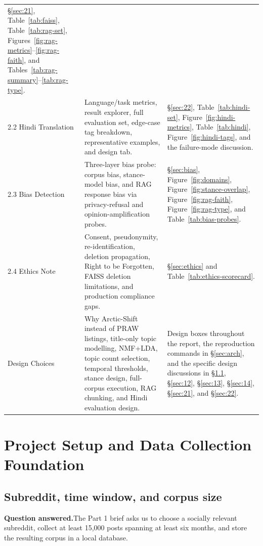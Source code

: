 \documentclass[11pt,a4paper]{article}
\newcommand{\questionanswered}[1]{%
  \par\medskip\noindent\textbf{Question answered.}\quad #1\par\medskip%
}
\begin{document}
\begin{table}[H]
\begin{tabularx}{\linewidth}{p{2.7cm} X X}
\S\ref{sec:21}, Table~\ref{tab:faiss}, Table~\ref{tab:rag-set}, Figures~\ref{fig:rag-metrics}--\ref{fig:rag-faith}, and Tables~\ref{tab:rag-summary}--\ref{tab:rag-type}. \\
2.2 Hindi Translation &
Language/task metrics, result explorer, full evaluation set, edge-case tag breakdown, representative examples, and design tab. &
\S\ref{sec:22}, Table~\ref{tab:hindi-set}, Figure~\ref{fig:hindi-metrics}, Table~\ref{tab:hindi}, Figure~\ref{fig:hindi-tags}, and the failure-mode discussion. \\
2.3 Bias Detection &
Three-layer bias probe: corpus bias, stance-model bias, and RAG response bias via privacy-refusal and opinion-amplification probes. &
\S\ref{sec:bias}, Figure~\ref{fig:domains}, Figure~\ref{fig:stance-overlap}, Figure~\ref{fig:rag-faith}, Figure~\ref{fig:rag-type}, and Table~\ref{tab:bias-probes}. \\
2.4 Ethics Note &
Consent, pseudonymity, re-identification, deletion propagation, Right to be Forgotten, FAISS deletion limitations, and production compliance gaps. &
\S\ref{sec:ethics} and Table~\ref{tab:ethics-scorecard}. \\
Design Choices &
Why Arctic-Shift instead of PRAW listings, title-only topic modelling, NMF+LDA, topic count selection, temporal thresholds, stance design, full-corpus execution, RAG chunking, and Hindi evaluation design. &
Design boxes throughout the report, the reproduction commands in \S\ref{sec:arch}, and the specific design discussions in \S\ref{sec:setup}, \S\ref{sec:12}, \S\ref{sec:13}, \S\ref{sec:14}, \S\ref{sec:21}, and \S\ref{sec:22}. \\
\bottomrule
\end{tabularx}
\end{table}

\section{Project Setup and Data Collection Foundation}

\subsection{Subreddit, time window, and corpus size}
\label{sec:setup}

\questionanswered{The Part 1 brief asks us to choose a socially relevant subreddit, collect at
least 15{,}000 posts spanning at least six months, and store the resulting corpus in a local
database.}
\end{document}
